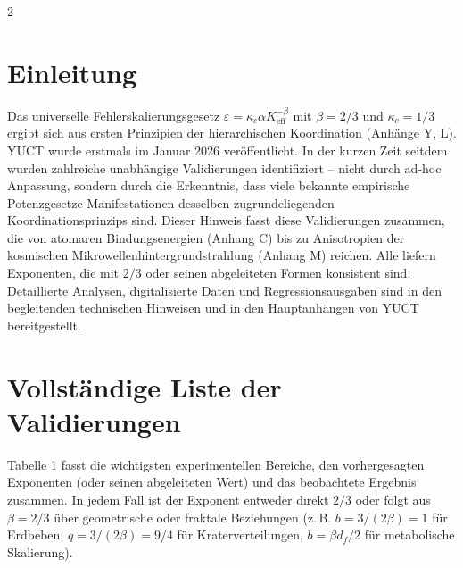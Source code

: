 \documentclass[11pt,a4paper]{article}
\newcommand{\eps}{\varepsilon}
\newcommand{\kappac}{\kappa_c}
\newcommand{\Keff}{K_{\mathrm{eff}}}
\newcommand{\betaf}{\beta}
\begin{document}
	\vspace{0.4cm}
	\vspace*{-\baselineskip}
	\begin{multicols}{2}
		
		\section{Einleitung}
		
		Das universelle Fehlerskalierungsgesetz \(\eps = \kappac \alpha \Keff^{-\betaf}\) mit \(\betaf = 2/3\) und \(\kappac = 1/3\) ergibt sich aus ersten Prinzipien der hierarchischen Koordination (Anhänge Y, L). YUCT wurde erstmals im Januar 2026 veröffentlicht. In der kurzen Zeit seitdem wurden zahlreiche unabhängige Validierungen identifiziert – nicht durch ad‑hoc Anpassung, sondern durch die Erkenntnis, dass viele bekannte empirische Potenzgesetze Manifestationen desselben zugrundeliegenden Koordinationsprinzips sind. Dieser Hinweis fasst diese Validierungen zusammen, die von atomaren Bindungsenergien (Anhang C) bis zu Anisotropien der kosmischen Mikrowellenhintergrundstrahlung (Anhang M) reichen. Alle liefern Exponenten, die mit \(2/3\) oder seinen abgeleiteten Formen konsistent sind. Detaillierte Analysen, digitalisierte Daten und Regressionsausgaben sind in den begleitenden technischen Hinweisen \cite{TN1,TN2,TN3,TN4,TN5} und in den Hauptanhängen von YUCT bereitgestellt.
		
		\section{Vollständige Liste der Validierungen}
		
		Tabelle 1 fasst die wichtigsten experimentellen Bereiche, den vorhergesagten Exponenten (oder seinen abgeleiteten Wert) und das beobachtete Ergebnis zusammen. In jedem Fall ist der Exponent entweder direkt \(2/3\) oder folgt aus \(\betaf = 2/3\) über geometrische oder fraktale Beziehungen (z. B. \(b = 3/(2\betaf) = 1\) für Erdbeben, \(q = 3/(2\betaf) = 9/4\) für Kraterverteilungen, \(b = \betaf d_f/2\) für metabolische Skalierung).
		

\end{multicols}
\end{document}
